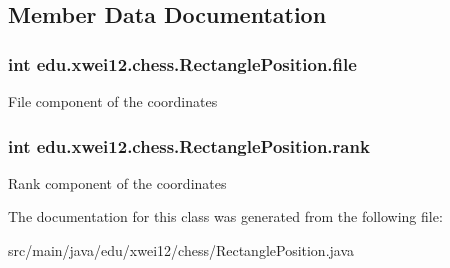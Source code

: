 \subsection{Member Data Documentation}
\subsubsection[{\texorpdfstring{file}{file}}]{\setlength{\rightskip}{0pt plus 5cm}int edu.\+xwei12.\+chess.\+Rectangle\+Position.\+file}\hypertarget{classedu_1_1xwei12_1_1chess_1_1_rectangle_position_ac7e18a9bb18f8a1d2ef0b6591fa4bffd}{}\label{classedu_1_1xwei12_1_1chess_1_1_rectangle_position_ac7e18a9bb18f8a1d2ef0b6591fa4bffd}
File component of the coordinates 
\subsubsection[{\texorpdfstring{rank}{rank}}]{\setlength{\rightskip}{0pt plus 5cm}int edu.\+xwei12.\+chess.\+Rectangle\+Position.\+rank}\hypertarget{classedu_1_1xwei12_1_1chess_1_1_rectangle_position_a6dd9047eb4002335ba2ad44621ca3407}{}\label{classedu_1_1xwei12_1_1chess_1_1_rectangle_position_a6dd9047eb4002335ba2ad44621ca3407}
Rank component of the coordinates 

The documentation for this class was generated from the following file\+:\begin{DoxyCompactItemize}
\item 
src/main/java/edu/xwei12/chess/Rectangle\+Position.\+java\end{DoxyCompactItemize}
